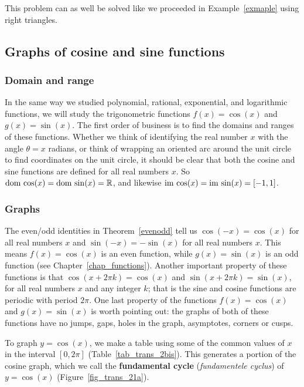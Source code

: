 \begin{example}
This problem can as well be solved like we proceeded in Example~\ref{exmaple} using right triangles. 

\end{example}	
\fi





\subsection{Graphs of cosine and sine functions}
\subsubsection{Domain and range}
In the same way we studied polynomial, rational, exponential, and logarithmic functions, we will study the trigonometric functions $f(x) = \cos(x)$ and $g(x) = \sin(x)$.  The first order of business is to find the domains and ranges of these functions.  Whether we think of identifying the real number $x$ with the angle $\theta = x$ radians, or think of wrapping an oriented arc around the unit circle to find coordinates on the unit circle, it should be clear that both the cosine and sine functions are defined for all real numbers $x$.  So $\text{dom}{\,}\cos(x)=\text{dom}{\,} \sin(x)=\mathbb{R}$, and likewise $\text{im}{\,} \cos(x)=\text{im}{\,}\sin(x)=[-1,1]$.   

\subsubsection{Graphs}
The even/odd identities in Theorem~\ref{evenodd} tell us $\cos(-x) = \cos(x)$ for all real numbers $x$ and $\sin(-x) = -\sin(x)$ for all real numbers $x$.  This means $f(x) = \cos(x)$ is an even function, while $g(x) = \sin(x)$ is an odd function (see Chapter~\ref{chap_functions}). Another important property of these  functions is that  $\cos(x + 2\pi k) = \cos(x)$ and $\sin(x + 2\pi k) = \sin(x)$, for all real numbers $x$ and any integer $k$; that is the sine and cosine functions are periodic with period $2\pi$. One last property of the functions $f(x) = \cos(x)$ and $g(x) = \sin(x)$ is worth pointing out:   the graphs of both of these functions have no jumps, gaps, holes in the graph,  asymptotes, corners or cusps.  

To graph $y = \cos(x)$, we make a table using some of the common values of $x$ in the interval $[0,2\pi]$ (Table~\ref{tab_trans_2bis}). This generates a portion of the cosine graph, which we call the \textbf{fundamental cycle} (\textit{fundamentele cyclus}) of $y = \cos(x)$ (Figure~\ref{fig_trans_21a}). 




